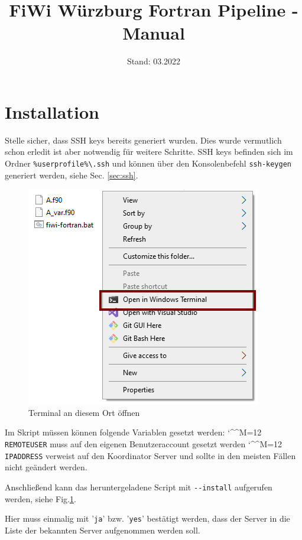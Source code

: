 \documentclass[11pt, a4paper]{article}
\title{\vspace{-3cm}FiWi Würzburg Fortran Pipeline - Manual}
\date{Stand: 03.2022}
\newcommand{\bs}{\textbackslash}
\def\e{\begingroup\catcode`\^^M=12 \xmymacro}
{\catcode`\^^M=12 %
 \gdef\xmymacro#1^^M{\begin{itemize}\item #1\end{itemize}\endgroup}%
}
\begin{document}
\maketitle

\bigskip\noindent


\vspace{-1cm}
\section{Installation}


Stelle sicher, dass SSH keys bereits generiert wurden. Dies wurde vermutlich schon erledit ist aber notwendig für weitere Schritte.
SSH keys befinden sich im Ordner \texttt{\%userprofile\%\bs.ssh} und können über den Konsolenbefehl \texttt{ssh-keygen} generiert werden, siehe Sec. \ref{sec:ssh}.

\begin{figure}
    \centering
    \includegraphics[width=0.65\linewidth]{./pics/2022-03-08_23-52.png}
    \caption{Terminal an diesem Ort öffnen}
    \vspace{-5em}
    \label{fig:install-1}
\end{figure}

Im Skript müssen können folgende Variablen gesetzt werden:
\e \texttt{REMOTEUSER} muss auf den eigenen Benutzeraccount gesetzt werden
\e \texttt{IPADDRESS} verweist auf den Koordinator Server und sollte in den meisten Fällen nicht geändert werden.

Anschließend kann das heruntergeladene Script mit \texttt{-{}-install} aufgerufen werden, siehe Fig.\ref{fig:install-1}.

Hier muss einmalig mit '\texttt{ja}' bzw. '\texttt{yes}' bestätigt werden, dass der Server in die Liste der bekannten Server aufgenommen werden soll.
\end{document}
